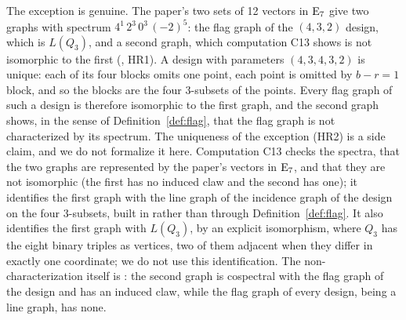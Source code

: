 \begin{remark}
 The exception is genuine. The paper's two sets of 12 vectors in $\mathrm{E}_7$ give two graphs with
 spectrum $4^1\,2^3\,0^3\,(-2)^5$: the flag graph of the $(4,3,2)$ design, which is
 $L(Q_3)$, and a second graph, which computation C13 shows is not isomorphic to the first
 (, HR1). A design with parameters $(4,3,4,3,2)$ is unique: each of
 its four blocks omits one point, each point is omitted by $b-r=1$ block, and so the blocks are
 the four $3$-subsets of the points. Every flag graph of such a design is therefore isomorphic to
 the first graph, and the second graph shows, in the sense of Definition~\ref{def:flag}, that the
 flag graph is not characterized by its spectrum. The uniqueness of the exception (HR2) is a side
 claim, and we do not formalize it here. Computation C13 checks the spectra, that the two graphs are
 represented by the paper's vectors in $\mathrm{E}_7$, and that they are not isomorphic (the first
 has no induced claw and the second has one); it identifies the first graph with the line graph
 of the incidence graph of the design on the four $3$-subsets, built in
  rather than through Definition~\ref{def:flag}.
 It also identifies the first graph with $L(Q_3)$, by an explicit isomorphism, where $Q_3$ has
 the eight binary triples as vertices, two of them adjacent when they differ in exactly one
 coordinate; we do not use this identification. The non-characterization itself is
 : the second graph is cospectral with the
 flag graph of the design and has an induced claw, while the flag graph of every design, being a
 line graph, has none.
\end{remark}


